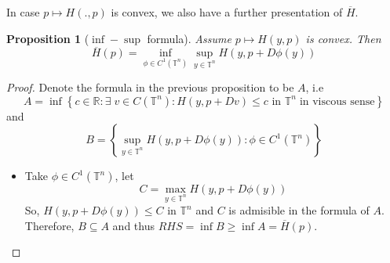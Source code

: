 \documentclass[12pt, oneside]{amsart}  	%
\newtheorem{proposition}{Proposition}
\begin{document}
In case $p\longmapsto H(.,p)$ is convex, we also have a further presentation of $\overline{H}$.
\begin{proposition}[$\inf-\sup$ formula]
Assume $p\mapsto H(y,p)$ is convex. Then
\begin{equation*}
\overline{H}(p)=\inf_{\phi\in C^1(\mathbb{T}^n)} \sup_{y\in \mathbb{T}^n} H(y, p+D\phi(y))
\end{equation*}
\end{proposition}
\begin{proof} Denote the formula in the previous proposition to be $A$, i.e
\begin{equation*}
A = \inf \left\lbrace c\in \mathbb{R}:\exists\;v\in C(\mathbb{T}^n): H(y, p+Dv)\le c \text{ in }\mathbb{T}^n\;\text{in viscous sense} \right\rbrace
\end{equation*}
and 
\begin{equation*}
B = \left\lbrace \sup_{y\in \mathbb{T}^n} H(y, p+D\phi(y)) : \phi\in C^1(\mathbb{T}^n) \right\rbrace
\end{equation*}
\begin{itemize}
\item Take $\phi \in C^1(\mathbb{T}^n)$, let 
\begin{equation*}
C=\max_{y\in \mathbb{T}^n} H(y, p + D\phi(y))
\end{equation*}
So, $H(y, p+D\phi(y)) \le C$ in $\mathbb{T}^n$ and $C$ is admisible in the formula of $A$. Therefore, $B\subseteq A$ and thus
$RHS = \inf B\ge \inf A=\overline{H}(p)$. \\


\end{itemize}
\end{proof}
\end{document}
